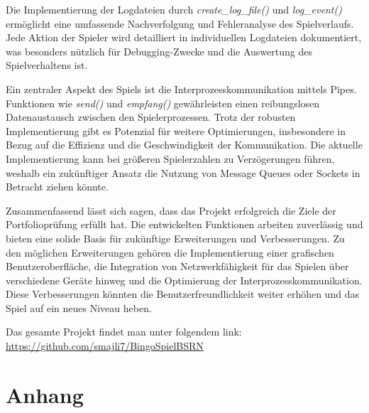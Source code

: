 \documentclass{llncs}
\begin{document}
Die Implementierung der Logdateien durch \textit{create\_log\_file()} und \textit{log\_event()} ermöglicht eine umfassende Nachverfolgung und Fehleranalyse des Spielverlaufs. Jede Aktion der Spieler wird detailliert in individuellen Logdateien dokumentiert, was besonders nützlich für Debugging-Zwecke und die Auswertung des Spielverhaltens ist.

Ein zentraler Aspekt des Spiels ist die Interprozesskommunikation mittels Pipes. Funktionen wie \textit{send()} und \textit{empfang()} gewährleisten einen reibungslosen Datenaustausch zwischen den Spielerprozessen. Trotz der robusten Implementierung gibt es Potenzial für weitere Optimierungen, insbesondere in Bezug auf die Effizienz und die Geschwindigkeit der Kommunikation. Die aktuelle Implementierung kann bei größeren Spielerzahlen zu Verzögerungen führen, weshalb ein zukünftiger Ansatz die Nutzung von Message Queues oder Sockets in Betracht ziehen könnte.

Zusammenfassend lässt sich sagen, dass das Projekt erfolgreich die Ziele der Portfolioprüfung erfüllt hat. Die entwickelten Funktionen arbeiten zuverlässig und bieten eine solide Basis für zukünftige Erweiterungen und Verbesserungen. Zu den möglichen Erweiterungen gehören die Implementierung einer grafischen Benutzeroberfläche, die Integration von Netzwerkfähigkeit für das Spielen über verschiedene Geräte hinweg und die Optimierung der Interprozesskommunikation. Diese Verbesserungen könnten die Benutzerfreundlichkeit weiter erhöhen und das Spiel auf ein neues Niveau heben.

Das gesamte Projekt findet man unter folgendem link: \url{https://github.com/smajli7/BingoSpielBSRN}

\section{Anhang}
\end{document}
